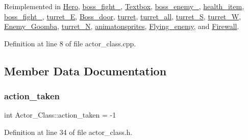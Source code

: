 Reimplemented in \hyperlink{class_hero_a24e136aeddd49d1a7d0c068079fbab7e}{Hero}, \hyperlink{classboss__fight__3_ab70b9f8a73d4fd1fe807f09c76a2267a}{boss\+\_\+fight\+\_}, \hyperlink{class_textbox_a4680a3e6bbaa33dc57a585c7e0072b0a}{Textbox}, \hyperlink{classboss__enemy__2_a8d81c7498b4a31d735bd4af21ce81d84}{boss\+\_\+enemy\+\_}, \hyperlink{classhealth__item_a60ce7f7099abb26dcc159fdf115d63eb}{health\+\_\+item}, \hyperlink{classboss__fight__1_a2ecde11495757971f23f45e78f23c5f7}{boss\+\_\+fight\+\_}, \hyperlink{classturret___e_a126e7a9b7731b83d5cdb3661807370bb}{turret\+\_\+E}, \hyperlink{class_boss__door_a27456c378555a03310cd4f25b167867c}{Boss\+\_\+door}, \hyperlink{classturret_a814fbc1d3c0ea9e10b9ec1edb3e5f734}{turret}, \hyperlink{classturret__all_a03416eb03334f4ee225c31cd18d25ba1}{turret\+\_\+all}, \hyperlink{classturret___s_a9ecfd60470958a3bcfbda2f4b751f8ab}{turret\+\_\+S}, \hyperlink{classturret___w_a3d06d812bd3f9905a2965372478f9ebd}{turret\+\_\+W}, \hyperlink{class_enemy___goomba_a0b72ff73bb4f64d4c659a5142862fd1f}{Enemy\+\_\+\+Goomba}, \hyperlink{classturret___n_ac8ad5be9e03657d090a45f6198812f35}{turret\+\_\+N}, \hyperlink{classanimatonsprites_a1cf7f2fb8b5a3299b05052c8b6328f01}{animatonsprites}, \hyperlink{class_flying__enemy_a0b55c3bf770b7f94fa6892cac47c80bd}{Flying\+\_\+enemy}, and \hyperlink{class_firewall_ac08bd22ea41caaa8ab269a9b1e0d36aa}{Firewall}.



Definition at line 8 of file actor\+\_\+class.\+cpp.



\subsection{Member Data Documentation}
\hypertarget{class_actor___class_ad964e0b5531233ed93d765343ec266bd}{}\label{class_actor___class_ad964e0b5531233ed93d765343ec266bd} 
\subsubsection{\texorpdfstring{action\+\_\+taken}{action\_taken}}
{\footnotesize\ttfamily int Actor\+\_\+\+Class\+::action\+\_\+taken = -\/1}



Definition at line 34 of file actor\+\_\+class.\+h.

\hypertarget{class_actor___class_aeeeefb9c4a5ed7b67e380dbbd5249889}{}\label{class_actor___class_aeeeefb9c4a5ed7b67e380dbbd5249889} 
